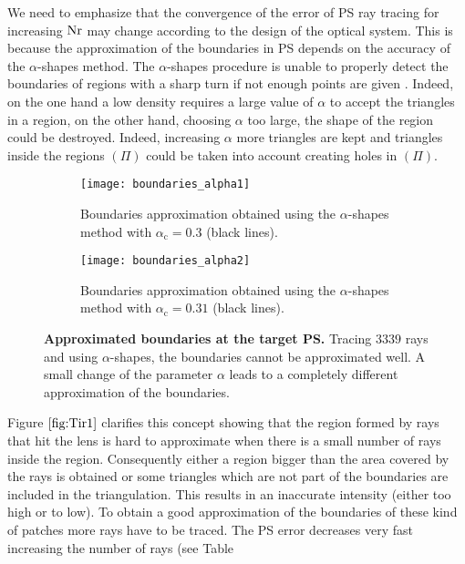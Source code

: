 We need to emphasize that the convergence of the error of PS ray tracing for increasing $\textrm{Nr}$ may change according to the design of the optical system.
This is because the approximation of the boundaries in PS depends on the accuracy of the $\alpha$-shapes method.
The $\alpha$-shapes procedure is unable to properly detect the boundaries of regions with a sharp turn if not enough points are given
\cite{teichmann1998surface}. Indeed, on the one hand a low density requires a large value of $\alpha$ to accept the triangles in a region, on the other hand,
 choosing $\alpha$ too large, the shape of the region could be destroyed. Indeed, increasing $\alpha$ more triangles are kept and triangles inside the regions $(\Pi)$ could be taken into account creating holes in $(\Pi)$.
\begin{figure}[h]
\centering
\begin{subfigure}{.48\textwidth}
  \centering
  \texttt{[image: boundaries\_alpha1]}
  \caption{Boundaries approximation obtained using the $\alpha$-shapes method with $\alpha_\textrm{c} = 0.3$ (black lines).}
\end{subfigure}
\hfill
\begin{subfigure}{.48\textwidth}
  \centering
  \texttt{[image: boundaries\_alpha2]}
  \caption{Boundaries approximation obtained using the $\alpha$-shapes method with $\alpha_\textrm{c} = 0.31$ (black lines).}
\end{subfigure}
\caption{\textbf{Approximated boundaries at the target PS.} Tracing $3339$ rays and using $\alpha$-shapes, the boundaries cannot be approximated well. 
A small change of the parameter $\alpha$ leads to a completely different approximation of the boundaries.}
\label{fig:Tir1}
\end{figure}
Figure $\ref{fig:Tir1}$ clarifies this concept showing that the region formed by rays that hit the lens is hard to approximate when there is a small number of rays inside the region. Consequently either a region bigger than the area covered by the rays is obtained or some triangles which are not part of the boundaries are included in the triangulation. This results in an inaccurate intensity (either too high or to low). To obtain a good approximation of the boundaries of these kind of patches more rays have to be traced. The PS error decreases very fast increasing the number of rays (see Table
